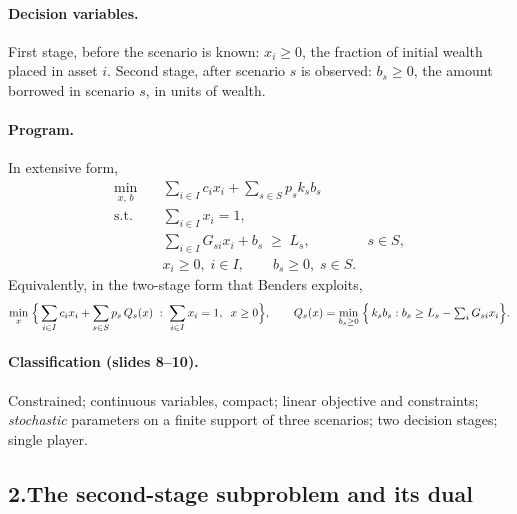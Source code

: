 \documentclass[11pt]{article}
\DeclareMathOperator*{\minimize}{min}
\theoremstyle{definition}
\begin{document}
\paragraph{Decision variables.} First stage, before the scenario is
known: $x_i \ge 0$, the fraction of initial wealth placed in asset $i$.
Second stage, after scenario $s$ is observed: $b_s \ge 0$, the amount
borrowed in scenario $s$, in units of wealth.

\paragraph{Program.} In extensive form,
\begin{equation}\label{eq:p3ef}
\begin{aligned}
  \minimize_{x,\,b}\quad
    & \sum_{i \in I} c_i x_i
      + \sum_{s \in S} p_s k_s b_s\\
  \text{s.t.}\quad
    & \sum_{i \in I} x_i = 1,\\
    & \sum_{i \in I} G_{si} x_i + b_s \;\ge\; L_s, & s \in S,\\
    & x_i \ge 0,\; i \in I, \qquad b_s \ge 0,\; s \in S .
\end{aligned}
\end{equation}
Equivalently, in the two-stage form that Benders exploits,
\begin{equation}\label{eq:p3two}
  \minimize_{x}\;\Bigl\{\,
    \sum_{i \in I} c_i x_i + \sum_{s \in S} p_s\, Q_s(x)
    \;:\; \sum_{i \in I} x_i = 1,\;\; x \ge 0 \Bigr\},
  \qquad
  Q_s(x) = \minimize_{b_s \ge 0}\;\Bigl\{\,
    k_s b_s : b_s \ge L_s - \textstyle\sum_{i} G_{si} x_i \Bigr\}.
\end{equation}

\paragraph{Classification (slides 8--10).} Constrained; continuous
variables, compact; linear objective and constraints; \emph{stochastic}
parameters on a finite support of three scenarios; two decision stages;
single player.

\subsection*{2.\quad The second-stage subproblem and its dual}
\end{document}
